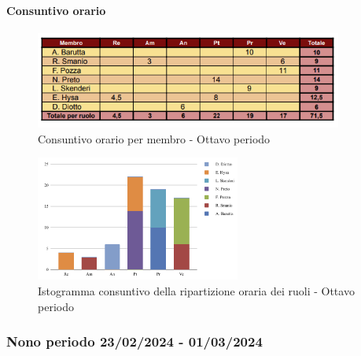 \paragraph{Consuntivo orario}

\begin{figure}[H]
    \centering
    \includegraphics[width=0.9\textwidth]{../Images/tabCons8.png}
    \caption{Consuntivo orario per membro - Ottavo periodo}
    \label{fig:Constuntivo_orario_8}
\end{figure}

\begin{figure}[H]
    \centering
    \includegraphics[width=0.6\textwidth]{../Images/graficoCons8.png}
    \caption{Istogramma consuntivo della ripartizione oraria dei ruoli - Ottavo periodo}
    \label{fig:Consuntivo_ripartizione_oraria_8}
\end{figure}


\subsubsection{Nono periodo  23/02/2024 - 01/03/2024}

